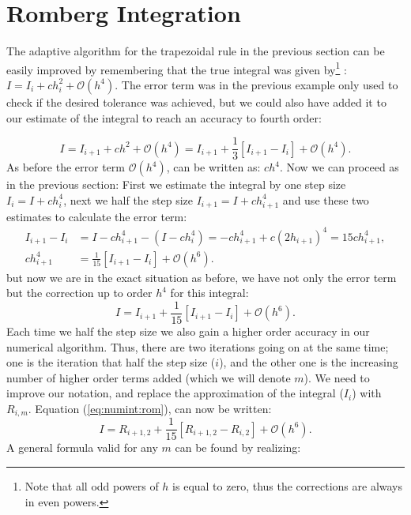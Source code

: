 \documentclass[graybox,sectrefs,envcountresetchap,open=right,final]{svmonodo}
\begin{document}
\section{Romberg Integration}
The adaptive algorithm for the trapezoidal rule in the previous section can be easily improved by remembering 
that the true integral was given by\footnote{Note that all odd powers of $h$ is equal to zero, thus the corrections are always in even powers.} : $I=I_i+ch_i^2+\mathcal{O}(h^4)$. The error term was in the previous example only used to 
check if the desired tolerance was achieved, but we could also have added it to our estimate of the integral to reach an accuracy to fourth order:



\begin{equation}
I=I_{i+1}+ch^2+\mathcal{O}(h^4)=I_{i+1}+\frac{1}{3}\left[I_{i+1}-I_{i}\right]+\mathcal{O}(h^4).
\end{equation}
As before the error term $\mathcal{O}(h^4)$, can be written as: $ch^4$. Now we can proceed as in the previous section: First we estimate the 
integral by one step size $I_i=I+ch_i^4$, next we half the step size $I_{i+1}=I+ch_{i+1}^4$ and use these two estimates to calculate the error term:
\begin{align}
I_{i+1}-I_{i}&=I-c h_{i+1}^4-(I-ch_i^4)=-c h_{i+1}^4+c(2h_{i+1})^4=15c h_{i+1}^4,\nonumber\\ 
ch_{i+1}^4&=\frac{1}{15}\left[I_{i+1}-I_{i}\right]+\mathcal{O}(h^6).
\end{align}
but now we are in the exact situation as before, we have not only the error term but the correction up to order $h^4$ for this integral:
\begin{equation}
I=I_{i+1}+\frac{1}{15}\left[I_{i+1}-I_{i}\right]+\mathcal{O}(h^6).\label{eq:numint:rom}
\end{equation}
Each time we half the step size we also gain a higher order accuracy in our numerical algorithm. Thus, there are two iterations going on at the same time; 
one is the iteration that half the step size ($i$), and the other one is the increasing number of higher order terms added (which we will denote $m$). 
We need to improve our notation, and replace the approximation of the integral ($I_i$) with $R_{i,m}$. Equation (\ref{eq:numint:rom}), can now 
be written:
\begin{equation}
I=R_{i+1,2}+\frac{1}{15}\left[R_{i+1,2}-R_{i,2}\right]+\mathcal{O}(h^6).
\end{equation}
A general formula valid for any $m$ can be found by realizing:
\end{document}
